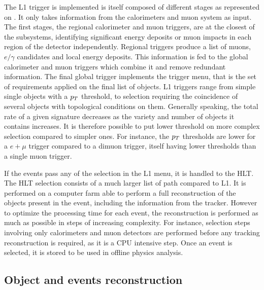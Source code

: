 
        The L1 trigger is implemented is itself composed of different stages as
        represented on . It only takes information from
        the calorimeters and muon system as input. The first stages, the regional calorimeter
        and muon triggers, are at the closest of the subsystems, identifying significant
        energy deposits or muon impacts in each region of the detector independently.
        Regional triggers produce a list of muons, $e/\gamma$ candidates and local energy
        deposits. This information is fed to the global calorimeter and muon triggers which
        combine it and remove redundant information. The final global trigger implements
        the trigger menu, that is the set of requirements applied on the final list of
        objects. L1 triggers range from simple single objects with a $p_T$ threshold, to
        selection requiring the coincidence of several objects with topological conditions
        on them. Generally speaking, the total rate of a given signature decreases as the
        variety and number of objects it contains increases. It is therefore possible to
        put lower threshold on more complex selection compared to simpler ones. For instance,
        the $p_T$ thresholds are lower for a $e+\mu$ trigger compared to a dimuon trigger,
        itself having lower thresholds than a single muon trigger.

        If the events pass any of the selection in the L1 menu, it is handled to the HLT.
        The HLT selection consists of a much larger list of path compared to L1.
        It is performed on a computer farm able to perform a full reconstruction
        of the objects present in the event, including the information from the tracker.
        However to optimize the processing time for each event, the reconstruction is
        performed as much as possible in steps of increasing complexity. For instance,
        selection steps involving only calorimeters and muon detectors are performed before
        any tracking reconstruction is required, as it is a CPU intensive step. Once
        an event is selected, it is stored to be used in offline physics analysis.

        \subsection{Object and events reconstruction}

